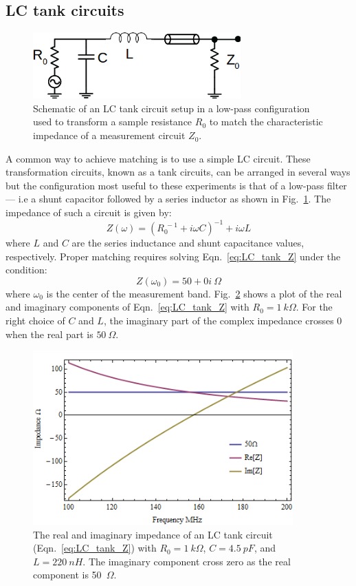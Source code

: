 \subsection{LC tank circuits}
\begin{figure}
\centering
\includegraphics[width=80mm]{figures/Johnson_noise_thermometry/schematic_matching.png}
\caption{Schematic of an LC tank circuit setup in a low-pass configuration used to transform a sample resistance $R_0$ to match the characteristic impedance of a measurement circuit $Z_0$.}
\label{fig:schematic_matching}
\end{figure}
A common way to achieve matching is to use a simple LC circuit. These transformation circuits, known as a tank circuits, can be arranged in several ways but the configuration most useful to these experiments is that of a low-pass filter --- i.e a shunt capacitor followed by a series inductor as shown in Fig.~\ref{fig:schematic_matching}. The impedance of such a circuit is given by:
\begin{equation}\label{eq:LC_tank_Z}
Z(\omega) = \left(R_0^{~-1}+i\omega C\right)^{-1}+i\omega L
\end{equation}
where $L$ and $C$ are the series inductance and shunt capacitance values, respectively. Proper matching requires solving Eqn.~\ref{eq:LC_tank_Z} under the condition:
\begin{equation}\label{eq:LC_tank_constraint}
Z(\omega_0) = 50+0i~\Omega 
\end{equation}
where $\omega_0$ is the center of the measurement band. Fig.~\ref{fig:LC_tank_Z} shows a plot of the real and imaginary components of Eqn.~\ref{eq:LC_tank_Z} with $R_0 = 1~k\Omega$. For the right choice of $C$ and $L$, the imaginary part of the complex impedance crosses $0$ when the real part is $50~\Omega$.
\begin{figure}
\centering
\includegraphics[width=100mm]{figures/Johnson_noise_thermometry/Impedance_matching2.png}
\caption{The real and imaginary impedance of an LC tank circuit (Eqn.~\ref{eq:LC_tank_Z}) with $R_0=1~k\Omega$, $C = 4.5~pF$, and $L = 220~nH$. The imaginary component cross zero as the real component is 50~$\Omega$.}
\label{fig:LC_tank_Z}
\end{figure}
